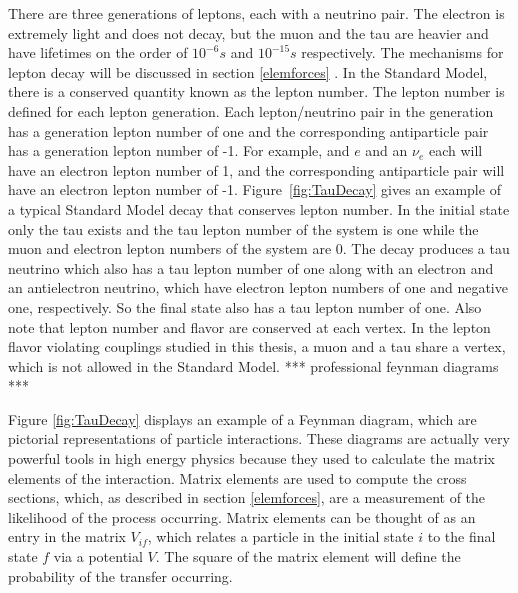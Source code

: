 \documentclass[oneside, letterpaper, oldfontcommands]{memoir}
\begin{document}

\qquad There are three generations of leptons, each with a neutrino pair. The electron is extremely light and does not decay, but the muon and the tau are heavier and have lifetimes on the order of $10^{-6}s$ and $10^{-15}s$ respectively\cite{Agashe:2014kda}. The mechanisms for lepton decay will be discussed in section \ref{elemforces} . In the Standard Model, there is a conserved quantity known as the lepton number. The lepton number is defined for each lepton generation. Each lepton/neutrino pair in the generation has a generation lepton number of one and the corresponding antiparticle pair has a generation lepton number of -1. For example, and $e$ and an $\nu_{e}$ each will have an electron lepton number of 1, and the corresponding antiparticle pair will have an electron lepton number of -1. Figure~\ref{fig:TauDecay} gives an example of a typical Standard Model decay that conserves lepton number. In the initial state only the tau exists and the tau lepton number of the system is one while the muon and electron lepton numbers of the system are 0. The decay produces a tau neutrino which also has a tau lepton number of one along with an electron and an antielectron neutrino, which have electron lepton numbers of one and negative one, respectively. So the final state also has a tau lepton number of one. Also note that lepton number and flavor are conserved at each vertex. In the lepton flavor violating couplings studied in this thesis, a muon and a tau share a vertex, which is not allowed in the Standard Model. *** professional feynman diagrams ***

Figure \ref{fig:TauDecay} displays an example of a Feynman diagram, which are pictorial representations of particle interactions. These diagrams are actually very powerful tools in high energy physics because they used to calculate the matrix elements of the interaction. Matrix elements are used to compute the cross sections, which, as described in section \ref{elemforces}, are a measurement of the likelihood of the process occurring. Matrix elements can be thought of as an entry in the matrix $V_{if}$, which relates a particle in the initial state $i$ to the final state $f$ via a potential $V$. The square of the matrix element will define the probability of the transfer occurring.
\end{document}
